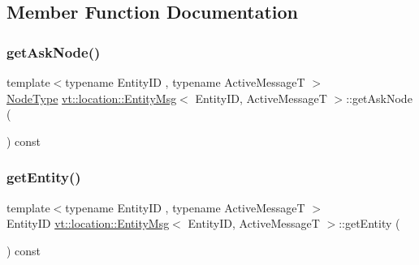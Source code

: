 \subsection{Member Function Documentation}
\mbox{\label{structvt_1_1location_1_1_entity_msg_a5a95c196dd8c41a15988b90bca30a316}} 
\subsubsection{\texorpdfstring{get\+Ask\+Node()}{getAskNode()}}
{\footnotesize\ttfamily template$<$typename Entity\+ID , typename Active\+MessageT $>$ \\
\hyperlink{namespacevt_a866da9d0efc19c0a1ce79e9e492f47e2}{Node\+Type} \hyperlink{structvt_1_1location_1_1_entity_msg}{vt\+::location\+::\+Entity\+Msg}$<$ Entity\+ID, Active\+MessageT $>$\+::get\+Ask\+Node (\begin{DoxyParamCaption}{ }\end{DoxyParamCaption}) const\hspace{0.3cm}{\ttfamily [inline]}}

\mbox{\label{structvt_1_1location_1_1_entity_msg_af288322a731d03cea544bc2e60bb10bd}} 
\subsubsection{\texorpdfstring{get\+Entity()}{getEntity()}}
{\footnotesize\ttfamily template$<$typename Entity\+ID , typename Active\+MessageT $>$ \\
Entity\+ID \hyperlink{structvt_1_1location_1_1_entity_msg}{vt\+::location\+::\+Entity\+Msg}$<$ Entity\+ID, Active\+MessageT $>$\+::get\+Entity (\begin{DoxyParamCaption}{ }\end{DoxyParamCaption}) const\hspace{0.3cm}{\ttfamily [inline]}}

\mbox{\label{structvt_1_1location_1_1_entity_msg_ab373f1520ac7374900bbea1026372b8e}} 
